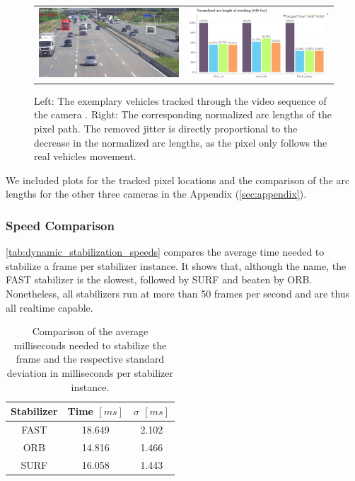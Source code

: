\begin{figure}[!ht]
    \centering
    \begin{tabular}{cc}
      \includegraphics[width=0.475\linewidth]{diagrams/object_tracking/s40_n_far/frame_cropped.png}    &  
      \includegraphics[width=0.475\linewidth]{diagrams/object_tracking/s40_n_far/normalized_arc_lengths.html.png}    
    \end{tabular}
    \caption{Left: 
    The exemplary vehicles tracked through the video sequence of the camera . 
    Right:
    The corresponding normalized arc lengths of the pixel path. 
    The removed jitter is directly proportional to the decrease in the normalized arc lengths, as the pixel only follows the real vehicles movement.
    }
    \label{fig:object_tracking_s40_n_far}
\end{figure}

We included plots for the tracked pixel locations and the comparison of the arc lengths for the other three cameras in the Appendix (\autoref{sec:appendix}).

\subsubsection{Speed Comparison}
\autoref{tab:dynamic_stabilization_speeds} compares the average time needed to stabilize a frame per stabilizer instance.
It shows that, although the name, the FAST stabilizer is the slowest, followed by SURF and beaten by ORB.
Nonetheless, all stabilizers run at more than 50 frames per second and are thus all realtime capable.

\begin{table}
    \begin{center}
      \begin{tabular}{ | c | c | c | }
        \hline
        Stabilizer & Time $[ms]$ & $\sigma$ $[ms]$ \\
        \hline
        FAST & 18.649 & 2.102 \\
        ORB  & 14.816 & 1.466 \\
        SURF & 16.058 & 1.443 \\
        \hline
      \end{tabular}
    \end{center}
    \caption{
        Comparison of the average milliseconds needed to stabilize the frame and the respective standard deviation in milliseconds per stabilizer instance.
    }
    \label{tab:dynamic_stabilization_speeds}
  \end{table}